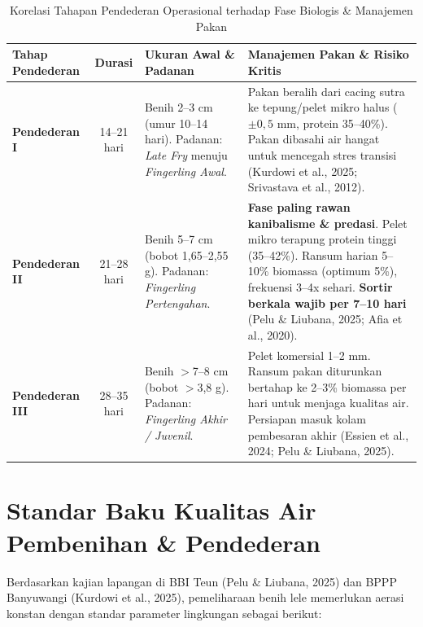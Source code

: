 \documentclass[11pt,a4paper]{article}
\begin{document}
\begin{table}[h!]
\centering
\small
\caption{Korelasi Tahapan Pendederan Operasional terhadap Fase Biologis \& Manajemen Pakan}
\vspace{4pt}
\begin{tabularx}{\textwidth}{p{2.6cm} c p{3.6cm} X}
\toprule
\textbf{Tahap Pendederan} & \textbf{Durasi} & \textbf{Ukuran Awal \& Padanan} & \textbf{Manajemen Pakan \& Risiko Kritis} \\
\midrule
\textbf{Pendederan I} & 14--21 hari & Benih 2--3 cm (umur 10--14 hari). Padanan: \textit{Late Fry} menuju \textit{Fingerling Awal}. & Pakan beralih dari cacing sutra ke tepung/pelet mikro halus ($\pm 0,5$ mm, protein 35--40\%). Pakan dibasahi air hangat untuk mencegah stres transisi (Kurdowi et al., 2025; Srivastava et al., 2012). \\
\addlinespace
\textbf{Pendederan II} & 21--28 hari & Benih 5--7 cm (bobot 1,65--2,55 g). Padanan: \textit{Fingerling Pertengahan}. & \textbf{Fase paling rawan kanibalisme \& predasi}. Pelet mikro terapung protein tinggi (35--42\%). Ransum harian 5--10\% biomassa (optimum 5\%), frekuensi 3--4x sehari. \textbf{Sortir berkala wajib per 7--10 hari} (Pelu \& Liubana, 2025; Afia et al., 2020). \\
\addlinespace
\textbf{Pendederan III} & 28--35 hari & Benih $>$7--8 cm (bobot $>$3,8 g). Padanan: \textit{Fingerling Akhir / Juvenil}. & Pelet komersial 1--2 mm. Ransum pakan diturunkan bertahap ke 2--3\% biomassa per hari untuk menjaga kualitas air. Persiapan masuk kolam pembesaran akhir (Essien et al., 2024; Pelu \& Liubana, 2025). \\
\bottomrule
\end{tabularx}
\end{table}

\section{Standar Baku Kualitas Air Pembenihan \& Pendederan}
Berdasarkan kajian lapangan di BBI Teun (Pelu \& Liubana, 2025) dan BPPP Banyuwangi (Kurdowi et al., 2025), pemeliharaan benih lele memerlukan aerasi konstan dengan standar parameter lingkungan sebagai berikut:
\end{document}
